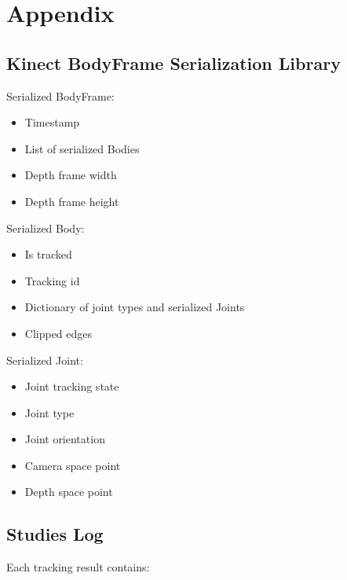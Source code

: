 


\chapter{Appendix}

\label{chapter:appendix}

\section{Kinect BodyFrame Serialization Library}
\label{sec:appendix_bodyframe_serialization}

Serialized BodyFrame:

\begin{itemize}
  \item Timestamp
  \item List of serialized Bodies
  \item Depth frame width
  \item Depth frame height
\end{itemize}

Serialized Body:

\begin{itemize}
  \item Is tracked
  \item Tracking id
  \item Dictionary of joint types and serialized Joints
  \item Clipped edges
\end{itemize}

Serialized Joint:

\begin{itemize}
  \item Joint tracking state
  \item Joint type
  \item Joint orientation
  \item Camera space point
  \item Depth space point
\end{itemize}

\section{Studies Log}
\label{sec:appendix_logging}

Each tracking result contains:

